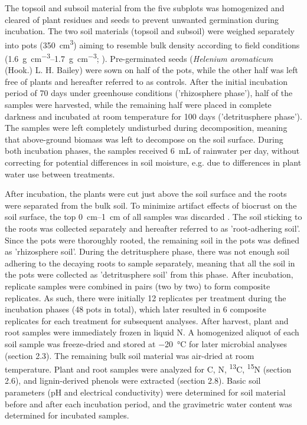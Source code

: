 The topsoil and subsoil material from the five subplots was homogenized and cleared of plant residues and seeds to prevent unwanted germination during incubation. The two soil materials (topsoil and subsoil) were weighed separately into pots (\SI{350}{\centi\metre\cubed}) aiming to resemble bulk density according to field conditions (\SIrange{1.6}{1.7}{\gram\per\centi\metre\cubed}; \citep{Bernhard2018}). Pre-germinated seeds (\textit{Helenium aromaticum} (Hook.) L. H. Bailey) were sown on half of the pots, while the other half was left free of plants and hereafter referred to as controls. After the initial incubation period of 70 days under greenhouse conditions ('rhizosphere phase'), half of the samples were harvested, while the remaining half were placed in complete darkness and incubated at room temperature for 100 days ('detritusphere phase'). The samples were left completely undisturbed during decomposition, meaning that above-ground biomass was left to decompose on the soil surface. During both incubation phases, the samples received \SI{6}{\milli\liter} of rainwater per day, without correcting for potential differences in soil moisture, e.g. due to differences in plant water use between treatments.

After incubation, the plants were cut just above the soil surface and the roots were separated from the bulk soil. To minimize artifact effects of biocrust on the soil surface, the top \SIrange{0}{1}{\centi\metre} of all samples was discarded \citep{Weber2022}. The soil sticking to the roots was collected separately and hereafter referred to as 'root-adhering soil'. Since the pots were thoroughly rooted, the remaining soil in the pots was defined as 'rhizosphere soil'. During the detritusphere phase, there was not enough soil adhering to the decaying roots to sample separately, meaning that all the soil in the pots were collected as 'detritusphere soil' from this phase. After incubation, replicate samples were combined in pairs (two by two) to form composite replicates. As such, there were initially 12 replicates per treatment during the incubation phases (48 pots in total), which later resulted in 6 composite replicates for each treatment for subsequent analyses. After harvest, plant and root samples were immediately frozen in liquid N. A homogenized aliquot of each soil sample was freeze-dried and stored at \SI{-20}{\degreeCelsius} for later microbial analyses (section 2.3). The remaining bulk soil material was air-dried at room temperature. Plant and root samples were analyzed for C, N, \textsuperscript{13}C, \textsuperscript{15}N (section 2.6), and lignin-derived phenols were extracted (section 2.8). Basic soil parameters (pH and electrical conductivity) were determined for soil material before and after each incubation period, and the gravimetric water content was determined for incubated samples.

